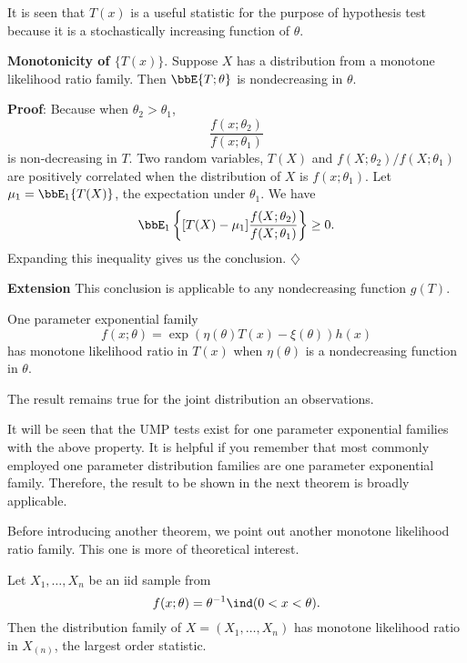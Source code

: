It is seen that $T(x)$ is a useful statistic for the purpose of hypothesis
test because it is a stochastically increasing function of $\theta$.

\begin{lemma}
\label{monotone}
{\bf Monotonicity of $\{T(x)\}$}.
Suppose $X$ has a distribution from a monotone likelihood ratio family.
Then $\bbE \{T; \theta\}$ is nondecreasing in $\theta$.
\end{lemma}

\vs\no
{\bf Proof}: Because when $\theta_2 > \theta_1$,
\[
\frac{f(x; \theta_2)}{f(x; \theta_1)}
\]
is non-decreasing in $T$. Two random variables,
$T(X)$ and $f(X; \theta_2)/f(X; \theta_1)$ are positively
correlated when the distribution of $X$ is $f(x; \theta_1)$.
Let $\mu_1 = \bbE_1\{T(X)\} $, the expectation under $\theta_1$.
We have
\[
\bbE_1 
\left \{ [ T(X) - \mu_1]\frac{ f(X; \theta_2)}{f(X; \theta_1)}
\right \} \geq 0.
\]
Expanding this inequality gives us the conclusion.
\hfill{$\diamondsuit$}

\vs \no
{\bf Extension}
This conclusion is applicable to any nondecreasing function $g(T)$.

\begin{example}
One parameter exponential family
\[
f(x; \theta) = \exp ( \eta(\theta) T(x) - \xi(\theta) ) h(x)
\]
has monotone likelihood ratio in $T(x)$ when $\eta(\theta)$
is a nondecreasing function in $\theta$.

The result remains true  for the joint distribution an \iid observations.
\end{example}

It will be seen that the UMP tests exist for one parameter exponential families
with the above property. It is helpful if you remember that most commonly
employed one parameter distribution families are one parameter
exponential family. Therefore, the result to be shown in the
next theorem is broadly applicable.

Before introducing another theorem, we point out another
monotone likelihood ratio family. This one is more of theoretical
interest.

\begin{example}
Let $X_1, \ldots, X_n$ be an iid sample from 
\[
f(x; \theta) = \theta^{-1} \ind ( 0 < x < \theta).
\]
Then the distribution family of $X = (X_1, \ldots, X_n)$
has monotone likelihood ratio in $X_{(n)}$, the largest
order statistic.
\end{example}

